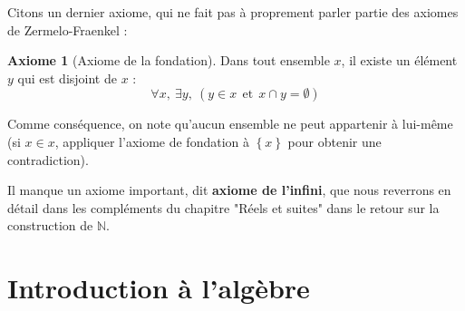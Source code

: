 \documentclass[french]{book}
\newcommand{\N}{\mathbb{N}}
\theoremstyle{plain}
\theoremstyle{definition}
\newtheorem{ax}{Axiome}[chapter]
\theoremstyle{remark}
\begin{document}
Citons un dernier axiome, qui ne fait pas à proprement parler partie des axiomes de Zermelo-Fraenkel : 
\begin{ax}[Axiome de la fondation]
	Dans tout ensemble $x$, il existe un élément $y$ qui est disjoint de $x$ : $$\forall x,\ \exists y,\ \left(y\in x \ \ \text{et}\ \ x\cap y=\emptyset\right)$$
\end{ax}
Comme conséquence, on note qu'aucun ensemble ne peut appartenir à lui-même (si $x\in x$, appliquer l'axiome de fondation à $\left\{x\right\}$ pour obtenir une contradiction). \\ \par Il manque un axiome important, dit \textbf{axiome de l'infini}, que nous reverrons en détail dans les compléments du chapitre "Réels et suites" dans le retour sur la construction de $\N$.



\newpage
\chapter{Introduction à l'algèbre}
\end{document}
